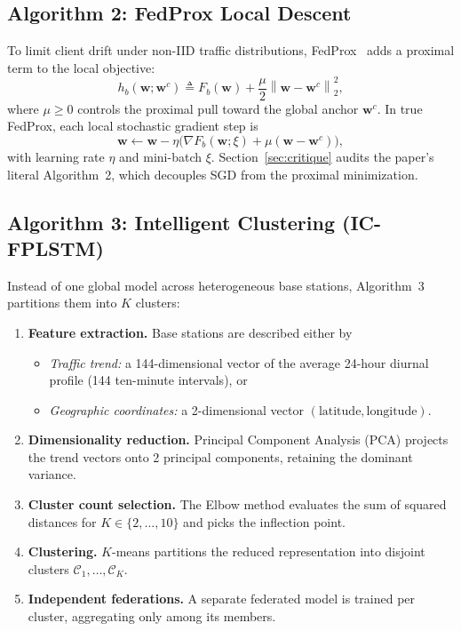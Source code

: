 \documentclass[11pt,a4paper]{article}
\begin{document}
\subsection{Algorithm 2: FedProx Local Descent}
To limit client drift under non-IID traffic distributions, FedProx~\cite{li2020federated} adds a proximal term to the local objective:
\begin{equation}
    h_b(\mathbf{w}; \mathbf{w}^c) \triangleq F_b(\mathbf{w}) + \frac{\mu}{2} \left\| \mathbf{w} - \mathbf{w}^c \right\|_2^2,
    \label{eq:fedprox_obj}
\end{equation}
where $\mu \ge 0$ controls the proximal pull toward the global anchor $\mathbf{w}^c$. In true FedProx, each local stochastic gradient step is
\begin{equation}
    \mathbf{w} \leftarrow \mathbf{w} - \eta \Big( \nabla F_b(\mathbf{w}; \xi) + \mu (\mathbf{w} - \mathbf{w}^c) \Big),
    \label{eq:true_fedprox_step}
\end{equation}
with learning rate $\eta$ and mini-batch $\xi$. Section~\ref{sec:critique} audits the paper's literal Algorithm~2, which decouples SGD from the proximal minimization.

\subsection{Algorithm 3: Intelligent Clustering (IC-FPLSTM)}
Instead of one global model across heterogeneous base stations, Algorithm~3 partitions them into $K$ clusters:
\begin{enumerate}
    \item \textbf{Feature extraction.} Base stations are described either by
    \begin{itemize}
        \item \textit{Traffic trend:} a 144-dimensional vector of the average 24-hour diurnal profile (144 ten-minute intervals), or
        \item \textit{Geographic coordinates:} a 2-dimensional vector $(\text{latitude}, \text{longitude})$.
    \end{itemize}
    \item \textbf{Dimensionality reduction.} Principal Component Analysis (PCA) projects the trend vectors onto 2 principal components, retaining the dominant variance.
    \item \textbf{Cluster count selection.} The Elbow method evaluates the sum of squared distances for $K \in \{2, \dots, 10\}$ and picks the inflection point.
    \item \textbf{Clustering.} $K$-means partitions the reduced representation into disjoint clusters $\mathcal{C}_1, \dots, \mathcal{C}_K$.
    \item \textbf{Independent federations.} A separate federated model is trained per cluster, aggregating only among its members.
\end{enumerate}
\end{document}
